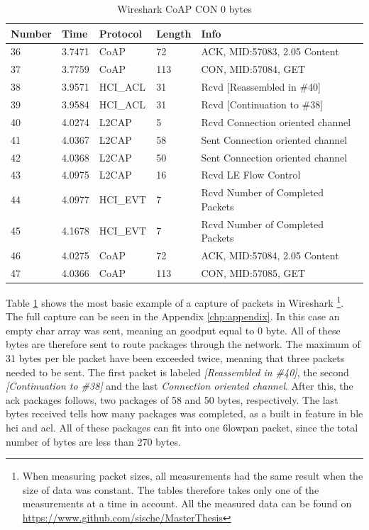 \begin{table}[ht]
\centering
\caption{Wireshark CoAP CON 0 bytes}
\label{coapCON0table}
\begin{tabular}{lllll}
Number & Time   & Protocol & Length & Info                             \\ \hline
36     & 3.7471 & CoAP     & 72     & ACK, MID:57083, 2.05 Content     \\
37     & 3.7759 & CoAP     & 113    & CON, MID:57084, GET              \\
38     & 3.9571 & HCI\_ACL & 31     & Rcvd {[}Reassembled in \#40{]}   \\
39     & 3.9584 & HCI\_ACL & 31     & Rcvd {[}Continuation to \#38{]}  \\
40     & 4.0274 & L2CAP    & 5      & Rcvd Connection oriented channel \\
41     & 4.0367 & L2CAP    & 58     & Sent Connection oriented channel \\
42     & 4.0368 & L2CAP    & 50     & Sent Connection oriented channel \\
43     & 4.0975 & L2CAP    & 16     & Rcvd LE Flow Control             \\
44     & 4.0977 & HCI\_EVT & 7      & Rcvd Number of Completed Packets \\
45     & 4.1678 & HCI\_EVT & 7      & Rcvd Number of Completed Packets \\
46     & 4.0275 & CoAP     & 72     & ACK, MID:57084, 2.05 Content     \\
47     & 4.0366 & CoAP     & 113    & CON, MID:57085, GET              \\ \hline
\end{tabular}
\end{table}

\noindent Table \ref{coapCON0table} shows the most basic example of a capture of packets in Wireshark \footnote{When measuring packet sizes, all measurements had the same result when the size of data was constant. The tables therefore takes only one of the measurements at a time in account. All the measured data can be found on \url{https://www.github.com/sische/MasterThesis}}. The full capture can be seen in the Appendix \ref{chp:appendix}. In this case an empty char array was sent, meaning an goodput equal to 0 byte. All of these bytes are therefore sent to route packages through the network. The maximum of 31 bytes per \gls{ble} packet have been exceeded twice, meaning that three packets needed to be sent. The first packet is labeled \textit{[Reassembled in \#40]}, the second \textit{[Continuation to \#38]} and the last \textit{Connection oriented channel}. After this, the \gls{ack} packages follows, two packages of 58 and 50 bytes, respectively. The last bytes received tells how many packages was completed, as a built in feature in \gls{ble}  \gls{hci}  and \gls{acl}. All of these packages can fit into one \gls{6lowpan} packet, since the total number of bytes are less than 270 bytes. 


